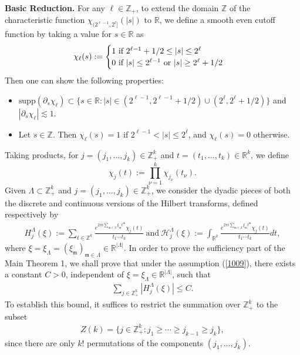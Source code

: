 \documentclass[11 pt,letterpaper]{amsart}
\theoremstyle{plain}
\theoremstyle{definition}
\theoremstyle{remark} \theoremstyle{exam} \theoremstyle{ob}
\numberwithin{equation}{section}
\begin{document}
 \noindent
{\bf Basic Reduction.} For any $\ell\in \mathbb{Z}_{+}$, to  extend the domain $\mathbb{Z}$ of the characteristic function   $\chi_{(2^{\ell-1},2^{\ell}]}(|s|)$   to $\mathbb{R}$,  we
define a smooth even cutoff function   by taking a value for $s\in \mathbb{R}$ as
\begin{align}\label{aria}
	\chi_\ell(s):=\begin{cases} 1\ \text{if $2^{\ell-1}+1/2 \le |s|\le 2^{\ell}$}\\
		0 \ \text{if $|s|\le  2^{\ell-1}$ or $ |s|\ge 2^{\ell}+1/2$}
	\end{cases} 
\end{align}
Then one can show the following properties:
\begin{itemize}
	\item[(1)] $\text{supp}(\partial_s\chi_{\ell})\subset \{s\in \mathbb{R}:|s|\in (2^{\ell-1},2^{\ell-1}+1/2)\cup (2^{\ell},2^{\ell}+1/2)\}$ and $|\partial_s\chi_{\ell}|\lesssim 1$. 
	\item[(2)]  Let $s\in \mathbb{Z}$. Then
	$\chi_\ell(s)=1$  if $2^{\ell-1}< |s|\le 2^{\ell} $, and $\chi_\ell(s)=0$ otherwise.
\end{itemize}
Taking products, for
$j=(j_1,\ldots,j_k)\in\mathbb Z_+^k$ and
$t=(t_1,\ldots,t_k)\in\mathbb R^k$, we define
\[
\chi_j(t):=\prod_{\nu=1}^k\chi_{j_\nu}(t_\nu).
\]
Given $\Lambda \subset \mathbb{Z}_+^k$ and $j= (j_1, \ldots, j_k) \in \mathbb{Z}_+^k$, we consider the dyadic pieces of both the discrete and continuous versions of the Hilbert transforms, defined respectively by
\begin{align*}
	H^{\Lambda}_j(\xi):= \sum_{t\in \mathbb{Z}^k}  \frac{e^{2\pi i \sum_{\mathfrak{m}\in\Lambda} \xi_{\mathfrak{m}} t^{\mathfrak{m}}}\chi_j(t)}{t_1\cdots t_k}\  \text{and}\  \mathcal{H}^{\Lambda}_j(\xi):= \int_{\mathbb{R}^k} \frac{e^{2\pi i \sum_{\mathfrak{m}\in\Lambda} \xi_{\mathfrak{m}} t^{\mathfrak{m}}}\chi_j(t)}{t_1\cdots t_k}dt,
\end{align*}
where $\xi=\xi_{\Lambda}=(\xi_{\mathfrak{m}})_{\mathfrak{m}\in \Lambda}\in \mathbb{R}^{|\Lambda|}$.  In order to prove the sufficiency part of the Main Theorem 1, we shall prove that under the assumption (\ref{1009}), there exists a constant $C > 0$, independent of $\xi=\xi_{\Lambda}\in \mathbb{R}^{|\Lambda|}$, such that
\begin{align}\label{se11}
\sum_{j\in \mathbb{Z}_+^k} |H_j^{\Lambda}(\xi)| \le C.
\end{align}
To establish this bound, it suffices to restrict the summation over $\mathbb{Z}_+^k$ to the subset
 \begin{align}
Z(k)=\{j\in \mathbb{Z}_{+}^{k}: j_1\ge \cdots \ge j_{k-1}\ge j_k\},\label{joor}
\end{align} 
since there are only $k!$ permutations of the components $(j_1, \ldots, j_k)$. 
\end{document}
